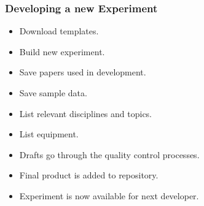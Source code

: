 \documentclass{beamer} %
\begin{document}

\begin{frame}
\frametitle{Developing a new Experiment}
    \begin{itemize}
    		\item Download templates.
    		\item Build new experiment.
    		\item Save papers used in development.
    		\item Save sample data.
    		\item List relevant disciplines and topics.
    		\item List equipment.
    		\item Drafts go through the quality control processes.
    		\item Final product is added to repository.
    		\item Experiment is now available for next developer.
    \end{itemize}
\end{frame}
\end{document}
